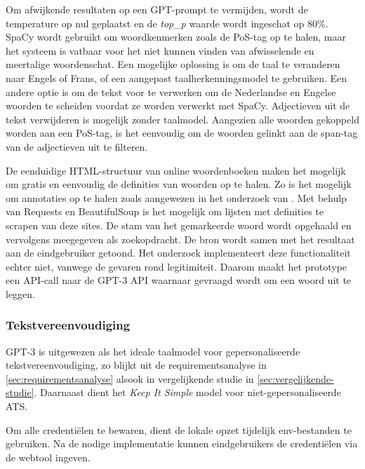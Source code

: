 \medspace

Om afwijkende resultaten op een GPT-prompt te vermijden, wordt de temperature op nul geplaatst en de \textit{top\_p} waarde wordt ingeschat op 80\%. SpaCy wordt gebruikt om woordkenmerken zoals de PoS-tag op te halen, maar het systeem is vatbaar voor het niet kunnen vinden van afwisselende en meertalige woordenschat. Een mogelijke oplossing is om de taal te veranderen naar Engels of Frans, of een aangepast taalherkenningsmodel te gebruiken. Een andere optie is om de tekst voor te verwerken om de Nederlandse en Engelse woorden te scheiden voordat ze worden verwerkt met SpaCy. Adjectieven uit de tekst verwijderen is mogelijk zonder taalmodel. Aangezien alle woorden gekoppeld worden aan een PoS-tag, is het eenvoudig om de woorden gelinkt aan de span-tag van de adjectieven uit te filteren.

\medspace

De eenduidige HTML-structuur van online woordenboeken maken het mogelijk om gratis en eenvoudig de definities van woorden op te halen. Zo is het mogelijk om annotaties op te halen zoals aangewezen in het onderzoek van \textcite{Bulte2018}. Met behulp van Requests en BeautifulSoup is het mogelijk om lijsten met definities te scrapen van deze sites. De stam van het gemarkeerde woord wordt opgehaald en vervolgens meegegeven als zoekopdracht. De bron wordt samen met het resultaat aan de eindgebruiker getoond. Het onderzoek implementeert deze functionaliteit echter niet, vanwege de gevaren rond legitimiteit. Daarom maakt het prototype een API-call naar de GPT-3 API waarnaar gevraagd wordt om een woord uit te leggen.

\subsubsection{Tekstvereenvoudiging}

GPT-3 is uitgewezen als het ideale taalmodel voor gepersonaliseerde tekstvereenvoudiging, zo blijkt uit de requirementsanalyse in \ref{sec:requirementsanalyse} alsook in vergelijkende studie in \ref{sec:vergelijkende-studie}. Daarnaast dient het \textit{Keep It Simple} model voor niet-gepersonaliseerde ATS.

Om alle credentiëlen te bewaren, dient de lokale opzet tijdelijk env-bestanden te gebruiken. Na de nodige implementatie kunnen eindgebruikers de credentiëlen via de webtool ingeven.

